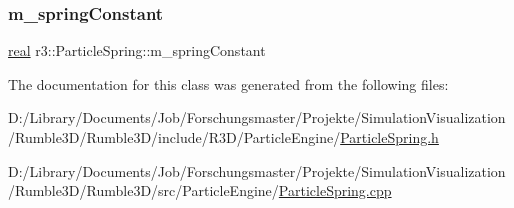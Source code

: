 \subsubsection{\texorpdfstring{m\+\_\+spring\+Constant}{m\_springConstant}}
{\footnotesize\ttfamily \mbox{\hyperlink{namespacer3_ab2016b3e3f743fb735afce242f0dc1eb}{real}} r3\+::\+Particle\+Spring\+::m\+\_\+spring\+Constant\hspace{0.3cm}{\ttfamily [protected]}}



The documentation for this class was generated from the following files\+:\begin{DoxyCompactItemize}
\item 
D\+:/\+Library/\+Documents/\+Job/\+Forschungsmaster/\+Projekte/\+Simulation\+Visualization/\+Rumble3\+D/\+Rumble3\+D/include/\+R3\+D/\+Particle\+Engine/\mbox{\hyperlink{_particle_spring_8h}{Particle\+Spring.\+h}}\item 
D\+:/\+Library/\+Documents/\+Job/\+Forschungsmaster/\+Projekte/\+Simulation\+Visualization/\+Rumble3\+D/\+Rumble3\+D/src/\+Particle\+Engine/\mbox{\hyperlink{_particle_spring_8cpp}{Particle\+Spring.\+cpp}}\end{DoxyCompactItemize}

